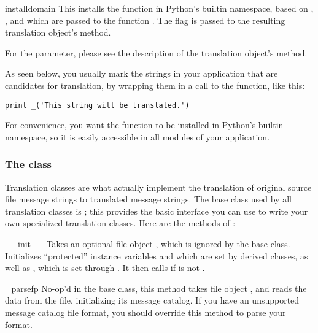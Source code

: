 \begin{funcdesc}{install}{domain}
This installs the function \function{_} in Python's builtin namespace,
based on , , and  which are
passed to the function .  The 
flag is passed to the resulting translation object's 
method.

For the  parameter, please see the description of the
translation object's  method.

As seen below, you usually mark the strings in your application that are
candidates for translation, by wrapping them in a call to the
\function{_()} function, like this:

\begin{verbatim}
print _('This string will be translated.')
\end{verbatim}

For convenience, you want the \function{_()} function to be installed in
Python's builtin namespace, so it is easily accessible in all modules
of your application.  

\end{funcdesc}

\subsubsection{The  class}
Translation classes are what actually implement the translation of
original source file message strings to translated message strings.
The base class used by all translation classes is
; this provides the basic interface you can use
to write your own specialized translation classes.  Here are the
methods of :

\begin{methoddesc}[NullTranslations]{__init__}{}
Takes an optional file object , which is ignored by the base
class.  Initializes ``protected'' instance variables  and
 which are set by derived classes, as well as ,
which is set through .  It then calls
 if  is not .
\end{methoddesc}

\begin{methoddesc}[NullTranslations]{_parse}{fp}
No-op'd in the base class, this method takes file object , and
reads the data from the file, initializing its message catalog.  If
you have an unsupported message catalog file format, you should
override this method to parse your format.
\end{methoddesc}

